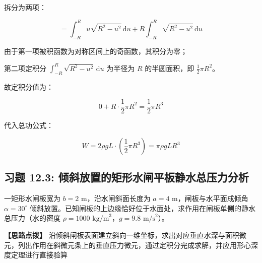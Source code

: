 \documentclass[11pt,a4paper,UTF8]{ctexart}
\begin{document}
\begin{solbox}[分步推导与答题规范]
拆分为两项：


\begin{equation*}
= \int_{-R}^R u\sqrt{R^2 - u^2}\,\mathrm{d}u + R \int_{-R}^R \sqrt{R^2 - u^2}\,\mathrm{d}u
\end{equation*}


由于第一项被积函数为对称区间上的奇函数，其积分为零；

第二项定积分 $\int_{-R}^R \sqrt{R^2 - u^2}\,\mathrm{d}u$ 为半径为 $R$ 的半圆面积，即 $\frac{1}{2}\pi R^2$。

故定积分值为：


\begin{equation*}
0 + R \cdot \frac{1}{2}\pi R^2 = \frac{1}{2}\pi R^3
\end{equation*}


代入总功公式：


\begin{equation*}
W = 2\rho g L \cdot \left(\frac{1}{2}\pi R^3\right) = \pi \rho g L R^3
\end{equation*}

\end{solbox}


\subsection{习题 12.3: 倾斜放置的矩形水闸平板静水总压力分析}

一矩形水闸板宽为 $b = 2\text{ m}$，沿水闸斜面长度为 $a = 4\text{ m}$，闸板与水平面成倾角 $\alpha = 30^\circ$ 倾斜放置。已知闸板的上边缘恰好位于水面处，求作用在闸板单侧的静水总压力（水的密度 $\rho = 1000\text{ kg/m}^3$，$g = 9.8\text{ m/s}^2$）。

\textbf{\color{DeepPurple}【思路点拨】} 沿倾斜闸板表面建立斜向一维坐标，求出对应垂直水深与面积微元，列出作用在斜微元条上的垂直压力微元，通过定积分完成求解，并应用形心深度定理进行直接验算
\end{document}
